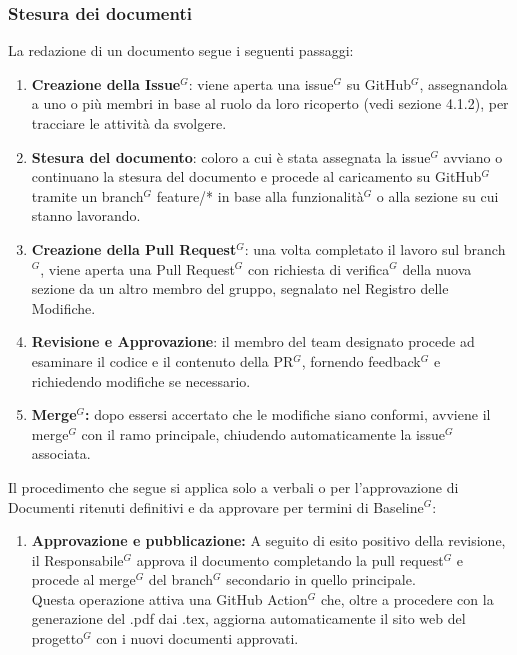 \subsubsection{Stesura dei documenti}
\label{sec:stesura-documenti}
La redazione di un documento segue i seguenti passaggi: 
\begin{enumerate}\setlength{\itemsep}{0pt}
    \item \textbf{Creazione della Issue$^G$}: viene aperta una issue$^G$ su GitHub$^G$, assegnandola a uno o più membri in base al ruolo da loro ricoperto (vedi sezione 4.1.2), per tracciare le attività da svolgere.
    \item \textbf{Stesura del documento}: coloro a cui è stata assegnata la issue$^G$ avviano o continuano la stesura del documento e procede al caricamento su GitHub$^G$ tramite un branch$^G$ feature/* in base alla funzionalità$^G$ o alla sezione su cui stanno lavorando.
    \item \textbf{Creazione della Pull Request$^G$}: una volta completato il lavoro sul branch$^G$, viene aperta una Pull Request$^G$ con richiesta di verifica$^G$ della nuova sezione da un altro membro del gruppo, segnalato nel Registro delle Modifiche.
    \item \textbf{Revisione e Approvazione}: il membro del team designato procede ad esaminare il codice e il contenuto della PR$^G$, fornendo feedback$^G$ e richiedendo modifiche se necessario.
    \item \textbf{Merge$^G$:} dopo essersi accertato che le modifiche siano conformi, avviene il merge$^G$ con il ramo principale, chiudendo automaticamente la issue$^G$ associata.
\end{enumerate}
Il procedimento che segue si applica solo a verbali o per l’approvazione di Documenti ritenuti definitivi e da approvare per termini di Baseline$^G$:
\begin{enumerate} [resume]
    \item \textbf{Approvazione e pubblicazione:} A seguito di esito positivo della revisione, il Responsabile$^G$ approva il documento completando la pull request$^G$ e procede al merge$^G$ del branch$^G$ secondario in quello principale.\\ Questa operazione attiva una GitHub Action$^G$ che, oltre a procedere con la generazione del .pdf dai .tex, aggiorna automaticamente il sito web del progetto$^G$ con i nuovi documenti approvati.
\end{enumerate}

